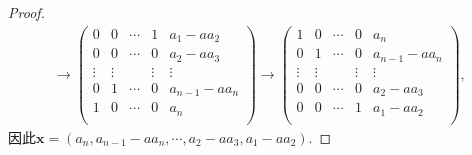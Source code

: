 \documentclass[lang=cn,newtx,10pt,scheme=chinese]{elegantbook}
\begin{document}
\begin{proof}
\begin{gather*}
\rightarrow \left( \begin{matrix}
0&		0&		\cdots&		1&		a_1-aa_2\\
0&		0&		\cdots&		0&		a_2-aa_3\\
\vdots&		\vdots&		&		\vdots&		\vdots\\
0&		1&		\cdots&		0&		a_{n-1}-aa_n\\
1&		0&		\cdots&		0&		a_n\\
\end{matrix} \right) \rightarrow \left( \begin{matrix}
1&		0&		\cdots&		0&		a_n\\
0&		1&		\cdots&		0&		a_{n-1}-aa_n\\
\vdots&		\vdots&		&		\vdots&		\vdots\\
0&		0&		\cdots&		0&		a_2-aa_3\\
0&		0&		\cdots&		1&		a_1-aa_2\\
\end{matrix} \right),
\end{gather*}
因此\(\boldsymbol{x}=(a_n,a_{n - 1} - a a_n,\cdots,a_2 - a a_3,a_1 - a a_2)\).
\end{proof}
\end{document}
